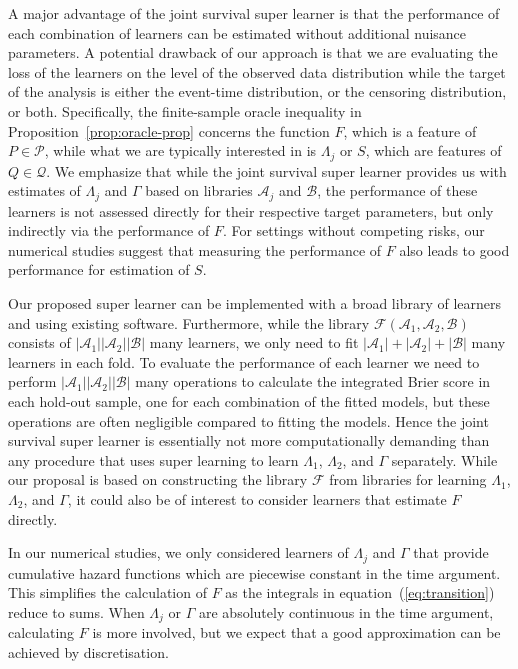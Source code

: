 \documentclass[lineno]{biometrika}
\newcommand{\1}{\mathds{1}}
\begin{document}
A major advantage of the joint survival super learner is that the performance of each
combination of learners can be estimated without additional nuisance
parameters. A potential drawback of our approach is that we are
evaluating the loss of the learners on the level of the observed data
distribution while the target of the analysis is either the event-time
distribution, or the censoring distribution, or both.
Specifically, the finite-sample oracle inequality in
Proposition~\ref{prop:oracle-prop} concerns the function \( F \), which
is a feature of \( P \in \mathcal{P} \), while what we are typically
interested in is \( \Lambda_j \) or \( S \), which are features of
\( Q \in \mathcal{Q} \). We emphasize that while the joint survival super learner
provides us with estimates of \( \Lambda_j \) and $\Gamma$ based on
libraries \( \mathcal{A}_j \) and \( \mathcal{B} \), the performance
of these learners is not assessed directly for their respective target
parameters, but only indirectly via the performance of \( F \).  For
settings without competing risks, our numerical studies suggest that
measuring the performance of \( F \) also leads to good performance
for estimation of \( S \).

Our proposed super learner can be implemented with a broad library of learners
and using existing software.
Furthermore, while
the library \( \mathcal{F}(\mathcal{A}_1,\mathcal{A}_2,\mathcal{B}) \) consists
of \( |\mathcal{A}_1||\mathcal{A}_2||\mathcal{B}| \) many learners, we only need to fit
\( |\mathcal{A}_1| +|\mathcal{A}_2| + |\mathcal{B}| \) many learners in each fold. To
evaluate the performance of each learner we need to perform
\( |\mathcal{A}_1||\mathcal{A}_2||\mathcal{B}| \) many operations to calculate the
integrated Brier score in each hold-out sample, one for each combination of the
fitted models, but these operations are often negligible compared to fitting the
models. Hence the joint survival super learner is essentially not more computationally demanding
than any procedure that uses super learning to learn $\Lambda_1$, $\Lambda_2$,
and $\Gamma$ separately. While our proposal is based on constructing the library
\( \mathcal{F} \) from libraries for learning \( \Lambda_1 \), $\Lambda_2$, and
$\Gamma$, it could also be of interest to consider learners that estimate
\( F \) directly.

In our numerical studies, we only considered learners of $\Lambda_j$ and
$\Gamma$ that provide cumulative hazard functions which are piecewise constant
in the time argument. This simplifies the calculation of \( F \) as the
integrals in equation~(\ref{eq:transition}) reduce to sums. When $\Lambda_j$ or
\( \Gamma \) are absolutely continuous in the time argument, calculating \( F \)
is more involved, but we expect that a good approximation can be achieved by
discretisation.
\end{document}
